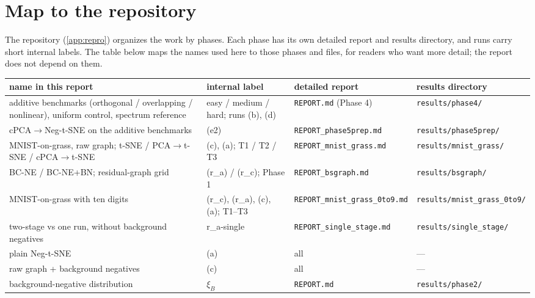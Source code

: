 \documentclass[10pt]{article}
\newcommand{\methodname}{BC-NE}
\newcommand{\BN}{\methodname{}+BN}
\begin{document}



\appendix

\section{Map to the repository}
\label{app:names}

The repository (\cref{app:repro}) organizes the work by phases. Each phase has its own detailed report and results directory, and runs carry short internal labels. The table below maps the names used here to those phases and files, for readers who want more detail; the report does not depend on them.

\begin{center}
\small
\setlength{\tabcolsep}{4pt}\begin{tabular}{p{4.2cm}p{3.3cm}p{3.6cm}p{3.9cm}}
  \toprule
  name in this report & internal label & detailed report & results directory \\
  \midrule
  additive benchmarks (orthogonal / overlapping / nonlinear), uniform control, spectrum reference & easy / medium / hard; runs (b), (d) & \texttt{REPORT.md} (Phase 4) & \texttt{results/phase4/} \\
  cPCA$\to$Neg-t-SNE on the additive benchmarks & (e2) & \texttt{REPORT\_phase5prep.md} & \texttt{results/phase5prep/} \\
  MNIST-on-grass, raw graph; t-SNE / PCA$\to$t-SNE / cPCA$\to$t-SNE & (c), (a); T1 / T2 / T3 & \texttt{REPORT\_mnist\_grass.md} & \texttt{results/mnist\_grass/} \\
  \methodname{} / \BN{}; residual-graph grid & (r\_a) / (r\_c); Phase 1 & \texttt{REPORT\_bsgraph.md} & \texttt{results/bsgraph/} \\
  MNIST-on-grass with ten digits & (r\_c), (r\_a), (c), (a); T1--T3 & \texttt{REPORT\_mnist\_grass\_\allowbreak 0to9.md} & \texttt{results/mnist\_grass\_\allowbreak 0to9/} \\
  two-stage vs one run, without background negatives & r\_a-single & \texttt{REPORT\_single\_stage.md} & \texttt{results/single\_stage/} \\
  \midrule
  plain Neg-t-SNE & (a) & all & --- \\
  raw graph + background negatives & (c) & all & --- \\
  background-negative distribution & $\xi_B$ & \texttt{REPORT.md} & \texttt{results/phase2/} \\
  \bottomrule
\end{tabular}
\end{center}
\end{document}
